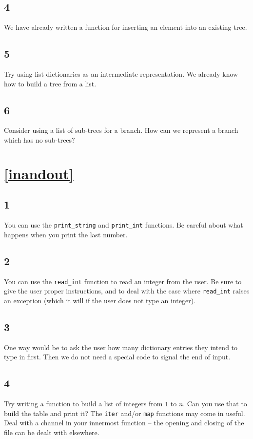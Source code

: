 \documentclass[]{book}
\begin{document}
\subsection*{4}
We have already written a function for inserting an element into an existing tree.

\subsection*{5}
Try using list dictionaries as an intermediate representation. We already know how to build a tree from a list.

\subsection*{6}
Consider using a list of sub-trees for a branch. How can we represent a branch which has no sub-trees?

\section*{\ref{inandout}\\ }
\subsection*{1}
You can use the \texttt{print\_string} and \texttt{print\_int} functions. Be careful about what happens when you print the last number.

\subsection*{2}
{\begin{sloppypar}You can use the \texttt{read\_int} function to read an integer from the user. Be sure to give the user proper instructions, and to deal with the case where \texttt{read\_int} raises an exception (which it will if the user does not type an integer).\end{sloppypar}}

\subsection*{3}
One way would be to ask the user how many dictionary entries they intend to type in first. Then we do not need a special code to signal the end of input.

\subsection*{4}
Try writing a function to build a list of integers from $1$ to $n$. Can you use that to build the table and print it? The \texttt{iter} and/or \texttt{map} functions may come in useful. Deal with a channel in your innermost function -- the opening and closing of the file can be dealt with elsewhere.
\end{document}
